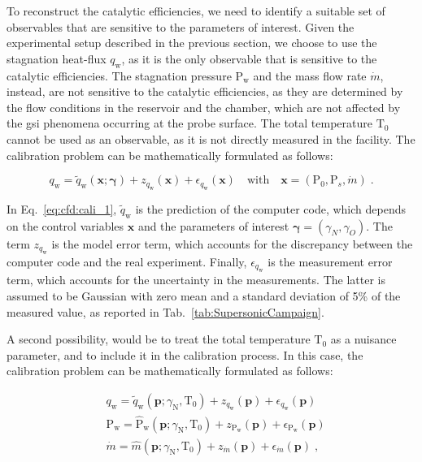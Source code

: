 To reconstruct the catalytic efficiencies, we need to identify a suitable set of observables that are sensitive to the parameters of interest. Given the experimental setup described in the previous section, we choose to use the stagnation heat-flux $q_\mathrm{w}$, as it is the only observable that is sensitive to the catalytic efficiencies. The stagnation pressure $\mathrm{P}_\mathrm{w}$ and the mass flow rate $\dot{m}$, instead, are not sensitive to the catalytic efficiencies, as they are determined by the flow conditions in the reservoir and the chamber, which are not affected by the \gls{gsi} phenomena occurring at the probe surface. The total temperature $\mathrm{T}_0$ cannot be used as an observable, as it is not directly measured in the facility. 
The calibration problem can be mathematically formulated as follows:

\begin{equation}
  q_\mathrm{w} = \tilde{q}_\mathrm{w}(\mathbf{x}; \boldsymbol{\gamma}) + z_{q_\mathrm{w}}(\mathbf{x}) + \epsilon_{q_\mathrm{w}}(\mathbf{x}) \quad \text{with} \quad \mathbf{x} = (\mathrm{P}_0, \mathrm{P}_s, \dot{m}) \;.
  \label{eq:cfd:cali_1}
\end{equation}

In Eq.~\eqref{eq:cfd:cali_1}, $\tilde{q}_\mathrm{w}$ is the prediction of the computer code, which depends on the control variables $\mathbf{x}$ and the parameters of interest $\boldsymbol{\gamma} = (\gamma_N, \gamma_O)$. The term $z_{q_\mathrm{w}}$ is the model error term, which accounts for the discrepancy between the computer code and the real experiment. Finally, $\epsilon_{q_\mathrm{w}}$ is the measurement error term, which accounts for the uncertainty in the measurements. The latter is assumed to be Gaussian with zero mean and a standard deviation of 5\% of the measured value, as reported in Tab.~\ref{tab:SupersonicCampaign}. 

\smallskip
A second possibility, would be to treat the total temperature $\mathrm{T}_0$ as a nuisance parameter, and to include it in the calibration process. In this case, the calibration problem can be mathematically formulated as follows:

\begin{equation}
  \left.
  \begin{aligned}
    &q_\mathrm{w} = \tilde{q}_\mathrm{w}(\mathbf{p}; \gamma_{\mathrm{N}}, \mathrm{T}_0) + z_{q_\mathrm{w}}(\mathbf{p}) + \epsilon_{q_\mathrm{w}}(\mathbf{p}) \\
    &\mathrm{P}_\mathrm{w} = \hat{\mathrm{P}}_\mathrm{w}(\mathbf{p}; \gamma_{\mathrm{N}}, \mathrm{T}_0) + z_{\mathrm{P}_\mathrm{w}}(\mathbf{p}) + \epsilon_{\mathrm{P}_\mathrm{w}}(\mathbf{p}) \\
    &\dot{m} = \hat{m}(\mathbf{p}; \gamma_{\mathrm{N}}, \mathrm{T}_0) + z_{\dot{m}}(\mathbf{p}) + \epsilon_{\dot{m}}(\mathbf{p}) \;,
  \end{aligned}
  \right.
  \label{eq:cfd:cali_2}
\end{equation}

